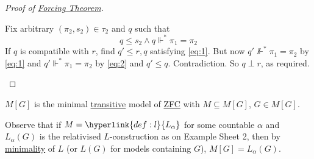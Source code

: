 \documentclass{article}
\newcommand{\1}{\mathbbm{1}}
\let\models\vDash
\let\forces\Vdash
\begin{document}
\begin{proof}[Proof of \hyperlink{thm:forcing}{Forcing Theorem}]
\begin{enumerate}
      Fix arbitrary $(\pi_2,s_2) \in \tau_2$ and $q$ such that
      \begin{equation*}
        q \leq s_2 \land q \forces^* \pi_1 = \pi_2 \tag{$**$} \label{eq:2}
      \end{equation*}
      If $q$ is compatible with $r$, find $q' \leq r,q$ satisfying \eqref{eq:1}.
      But now $q' \not\forces^* \pi_1 = \pi_2$ by \eqref{eq:1} and $q' \forces^* \pi_1 = \pi_2$ by \eqref{eq:2} and $q' \leq q$.
      Contradiction.
      So $q \perp r$, as required. \qedhere
  \end{enumerate}
\end{proof}

\begin{cor}
  \hyperlink{def:mg}{$M[G]$} is the minimal \hyperlink{def:transitive}{transitive} model of \hyperlink{def:axioms}{\textsf{ZFC}} with $M \subseteq M[G]$, $G \in M[G]$.
\end{cor}
Observe that if $M = \hyperlink{def:l}{L_\alpha}$ for some countable $\alpha$ and $L_\alpha(G)$ is the relativised $L$-construction as on Example Sheet 2, then by \hyperlink{thm:min}{minimality} of $L$ (or $L(G)$ for models containing $G$), $M[G] = L_\alpha(G)$.
\end{document}
